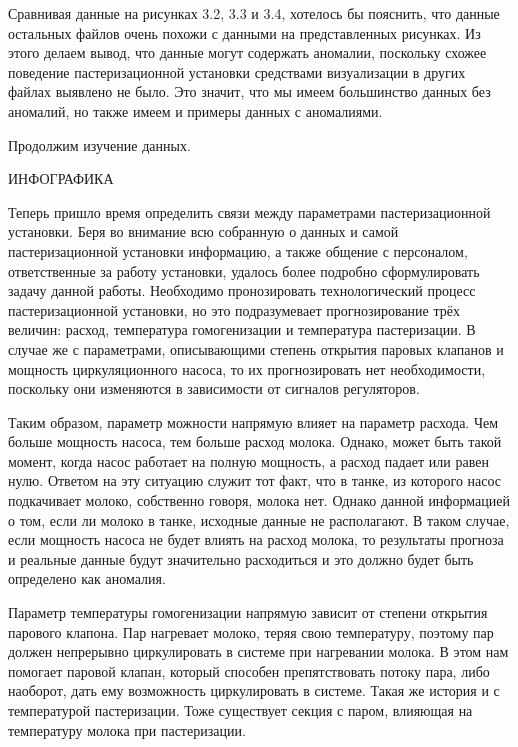 {  \par \redline Сравнивая данные на рисунках 3.2, 3.3 и 3.4, хотелось бы пояснить, что данные остальных файлов очень похожи с данными на представленных рисунках. Из этого делаем вывод, что данные могут содержать аномалии, поскольку схожее поведение пастеризационной установки средствами визуализации в других файлах выявлено не было. Это значит, что мы имеем большинство данных без аномалий, но также имеем и примеры данных с аномалиями. 

  \par \redline Продолжим изучение данных.

  ИНФОГРАФИКА


  \par \redline Теперь пришло время определить связи между параметрами пастеризационной установки. Беря во внимание всю собранную о данных и самой пастеризационной установки информацию, а также общение с персоналом, ответственные за работу установки, удалось более подробно сформулировать задачу данной работы. Необходимо пронозировать технологический процесс пастеризационной установки, но это подразумевает прогнозирование трёх величин: расход, температура гомогенизации и температура пастеризации. В случае же с параметрами, описывающими степень открытия паровых клапанов и мощность циркуляционного насоса, то их прогнозировать нет необходимости, поскольку они изменяются в зависимости от сигналов регуляторов. 

  \par \redline Таким образом, параметр можности напрямую влияет на параметр расхода. Чем больше мощность насоса, тем больше расход молока. Однако, может быть такой момент, когда насос работает на полную мощность, а расход падает или равен нулю. Ответом на эту ситуацию служит тот факт, что в танке, из которого насос подкачивает молоко, собственно говоря, молока нет. Однако данной информацией о том, если ли молоко в танке, исходные данные не располагают. В таком случае, если мощность насоса не будет влиять на расход молока, то результаты прогноза и реальные данные будут значительно расходиться и это должно будет быть определено как аномалия. 
  
  \par \redline Параметр температуры гомогенизации напрямую зависит от степени открытия парового клапона. Пар нагревает молоко, теряя свою температуру, поэтому пар должен непрерывно циркулировать в системе при нагревании молока. В этом нам помогает паровой клапан, который способен препятствовать потоку пара, либо наоборот, дать ему возможность циркулировать в системе. Такая же история и с температурой пастеризации. Тоже существует секция с паром, влияющая на температуру молока при пастеризации. 
  
}
